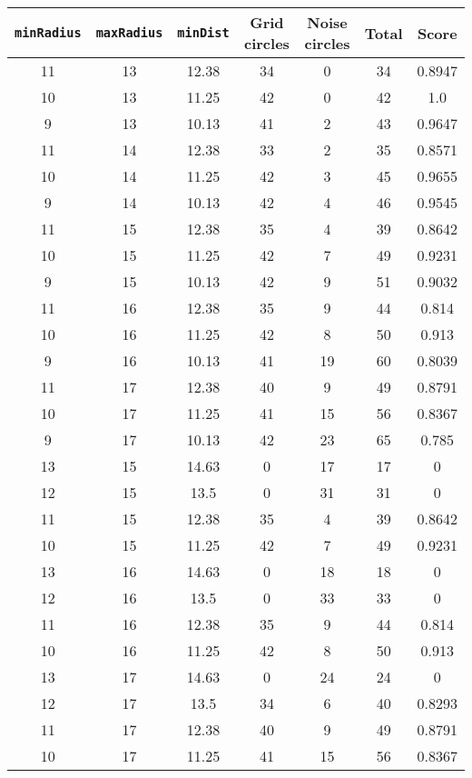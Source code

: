 \documentclass[letterpaper, 12pt]{article}
\begin{document}
\begin{longtable}{|c|c|c|c|c|c|c|}
\hline
\textbf{\texttt{minRadius}} & \textbf{\texttt{maxRadius}} & \textbf{\texttt{minDist}} & \textbf{Grid circles} & \textbf{Noise circles} & \textbf{Total} & \textbf{Score} \\
\hline
11 & 13 & 12.38 & 34 & 0 & 34 & 0.8947 \\
\hline
10 & 13 & 11.25 & 42 & 0 & 42 & 1.0 \\
\hline
9 & 13 & 10.13 & 41 & 2 & 43 & 0.9647 \\
\hline
11 & 14 & 12.38 & 33 & 2 & 35 & 0.8571 \\
\hline
10 & 14 & 11.25 & 42 & 3 & 45 & 0.9655 \\
\hline
9 & 14 & 10.13 & 42 & 4 & 46 & 0.9545 \\
\hline
11 & 15 & 12.38 & 35 & 4 & 39 & 0.8642 \\
\hline
10 & 15 & 11.25 & 42 & 7 & 49 & 0.9231 \\
\hline
9 & 15 & 10.13 & 42 & 9 & 51 & 0.9032 \\
\hline
11 & 16 & 12.38 & 35 & 9 & 44 & 0.814 \\
\hline
10 & 16 & 11.25 & 42 & 8 & 50 & 0.913 \\
\hline
9 & 16 & 10.13 & 41 & 19 & 60 & 0.8039 \\
\hline
11 & 17 & 12.38 & 40 & 9 & 49 & 0.8791 \\
\hline
10 & 17 & 11.25 & 41 & 15 & 56 & 0.8367 \\
\hline
9 & 17 & 10.13 & 42 & 23 & 65 & 0.785 \\
\hline
13 & 15 & 14.63 & 0 & 17 & 17 & 0 \\
\hline
12 & 15 & 13.5 & 0 & 31 & 31 & 0 \\
\hline
11 & 15 & 12.38 & 35 & 4 & 39 & 0.8642 \\
\hline
10 & 15 & 11.25 & 42 & 7 & 49 & 0.9231 \\
\hline
13 & 16 & 14.63 & 0 & 18 & 18 & 0 \\
\hline
12 & 16 & 13.5 & 0 & 33 & 33 & 0 \\
\hline
11 & 16 & 12.38 & 35 & 9 & 44 & 0.814 \\
\hline
10 & 16 & 11.25 & 42 & 8 & 50 & 0.913 \\
\hline
13 & 17 & 14.63 & 0 & 24 & 24 & 0 \\
\hline
12 & 17 & 13.5 & 34 & 6 & 40 & 0.8293 \\
\hline
11 & 17 & 12.38 & 40 & 9 & 49 & 0.8791 \\
\hline
10 & 17 & 11.25 & 41 & 15 & 56 & 0.8367 \\

\end{longtable}
\end{document}
